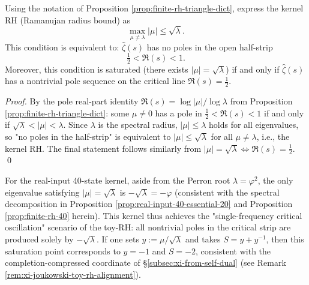 \begin{corollary}\label{cor:finite-rh-halfstrip-nopoles}
Using the notation of Proposition \ref{prop:finite-rh-triangle-dict}, express the kernel RH (Ramanujan radius bound) as
\[
\max_{\mu\neq \lambda}|\mu|\le \sqrt{\lambda}.
\]
This condition is equivalent to: \(\widehat{\zeta}(s)\) has no poles in the open half-strip
\[
\tfrac12<\Re(s)<1.
\]
Moreover, this condition is saturated (there exists \(|\mu|=\sqrt{\lambda}\)) if and only if \(\widehat{\zeta}(s)\) has a nontrivial pole sequence on the critical line \(\Re(s)=\tfrac12\).
\end{corollary}
\begin{proof}
By the pole real-part identity \(\Re(s)=\log|\mu|/\log\lambda\) from Proposition \ref{prop:finite-rh-triangle-dict}: some \(\mu\neq 0\) has a pole in \(\tfrac12<\Re(s)<1\) if and only if \(\sqrt{\lambda}<|\mu|<\lambda\).
Since \(\lambda\) is the spectral radius, \(|\mu|\le \lambda\) holds for all eigenvalues, so "no poles in the half-strip" is equivalent to \(|\mu|\le \sqrt{\lambda}\) for all \(\mu\neq\lambda\), i.e., the kernel RH.
The final statement follows similarly from \(|\mu|=\sqrt{\lambda}\iff \Re(s)=\tfrac12\). \qed
\end{proof}

\begin{remark}[Saturation position for this kernel: unique critical modulus \texorpdfstring{$|\mu|=\sqrt{\lambda}$}{|mu|=sqrt(lambda)}]\label{rem:finite-rh-40-ramanujan}
For the real-input 40-state kernel, aside from the Perron root $\lambda=\varphi^2$, the only eigenvalue satisfying $|\mu|=\sqrt{\lambda}$ is $-\sqrt{\lambda}=-\varphi$ (consistent with the spectral decomposition in Proposition \ref{prop:real-input-40-essential-20} and Proposition \ref{prop:finite-rh-40} herein).
This kernel thus achieves the "single-frequency critical oscillation" scenario of the toy-RH: all nontrivial poles in the critical strip are produced solely by $-\sqrt{\lambda}$.
If one sets \(y:=\mu/\sqrt{\lambda}\) and takes \(S=y+y^{-1}\), then this saturation point corresponds to \(y=-1\) and \(S=-2\), consistent with the completion-compressed coordinate of \S\ref{subsec:xi-from-self-dual} (see Remark \ref{rem:xi-joukowski-toy-rh-alignment}).
\end{remark}


